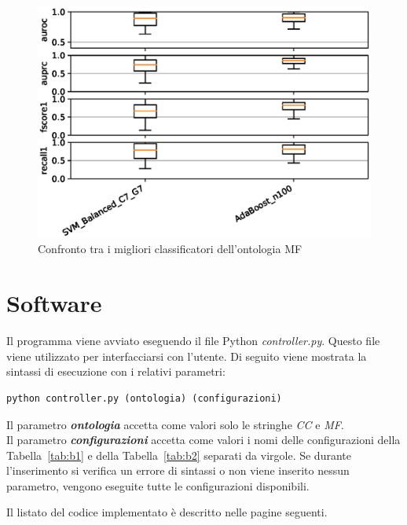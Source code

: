 \documentclass[12pt,a4paper,oneside,hidelinks]{report}
\begin{document}
\begin{figure}[hb]%
    \centering
    \includegraphics[scale = 0.80]{MF-level3.eps}%
    \caption{Confronto tra i migliori classificatori dell'ontologia MF}%
    \label{figure:liv31}%
\end{figure}

\vspace*{\fill}

\appendix
\chapter{Software}
Il programma viene avviato eseguendo il file Python \textit{controller.py}. Questo file viene utilizzato per interfacciarsi con l'utente.
Di seguito viene mostrata la sintassi di esecuzione con i relativi parametri:

\begin{lstlisting}
python controller.py (ontologia) (configurazioni)
\end{lstlisting}
Il parametro \textbf{\textit{ontologia}} accetta come valori solo le stringhe \textit{CC} e \textit{MF}. \\
Il parametro \textbf{\textit{configurazioni}} accetta come valori i nomi delle configurazioni della Tabella~\ref{tab:b1} e della Tabella~\ref{tab:b2} separati da virgole. Se durante l'inserimento si verifica un errore di sintassi o non viene inserito nessun parametro, vengono eseguite tutte le configurazioni disponibili.

Il listato del codice implementato è descritto nelle pagine seguenti.

\newpage

\lstset{style=customp}



\newpage



\newpage


\end{document}
